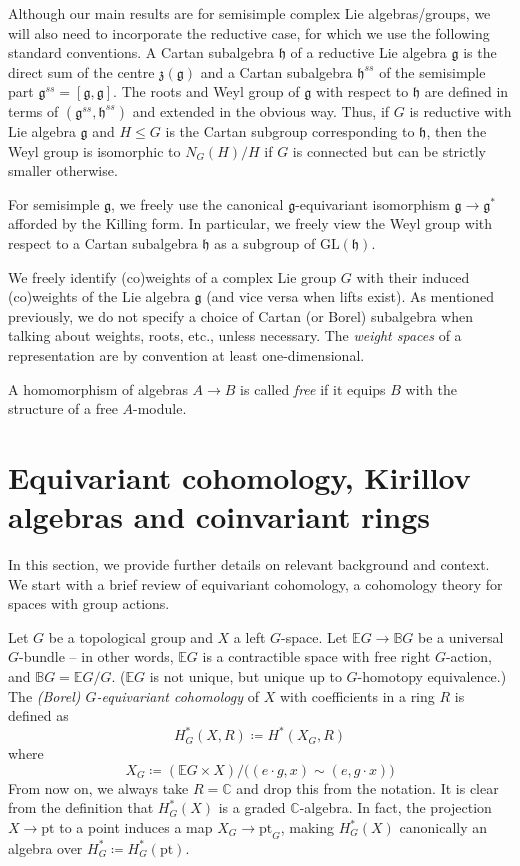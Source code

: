 \documentclass{amsart}
\newcommand{\C}{\mathbb{C}}
\newcommand{\g}{\mathfrak{g}}
\newcommand{\GL}{\mathrm{GL}}
\newcommand{\h}{\mathfrak{h}}
\newcommand{\pt}{\text{pt}}
\newcommand{\z}{\mathfrak{z}}
\theoremstyle{definition}
\theoremstyle{plain}
\theoremstyle{remark}
\begin{document}
Although our main results are for semisimple complex Lie algebras/groups, we will also need to incorporate the reductive case, for which we use the following standard conventions. A Cartan subalgebra $\h$ of a reductive Lie algebra $\g$ is the direct sum of the centre $\z(\g)$ and a Cartan subalgebra $\h^{ss}$ of the semisimple part $\g^{ss}=[\g,\g]$. The roots and Weyl group of $\g$ with respect to $\h$ are defined in terms of $(\g^{ss}, \h^{ss})$ and extended in the obvious way. Thus, if $G$ is reductive with Lie algebra $\g$ and $H\le G$ is the Cartan subgroup corresponding to $\h$, then the Weyl group is isomorphic to $N_G(H)/H$ if $G$ is connected but can be strictly smaller otherwise. 

For semisimple $\g$, we freely use the canonical $\g$-equivariant isomorphism $\g\to \g^*$ afforded by the Killing form. In particular, we freely view the Weyl group with respect to a Cartan subalgebra $\h$ as a subgroup of $\GL(\h)$.

We freely identify (co)weights of a complex Lie group $G$ with their induced (co)weights of the Lie algebra $\g$ (and vice versa when lifts exist). As mentioned previously, we do not specify a choice of Cartan (or Borel) subalgebra when talking about weights, roots, etc., unless necessary. The \emph{weight spaces} of a representation are by convention at least one-dimensional. 

A homomorphism of algebras $A\to B$ is called \emph{free} if it equips $B$ with the structure of a free $A$-module. 

\section{Equivariant cohomology, Kirillov algebras and coinvariant rings}
\label{sec:background}
In this section, we provide further details on relevant background and context. We start with a brief review of equivariant cohomology, a cohomology theory for spaces with group actions.

Let $G$ be a topological group and $X$ a left $G$-space. Let $\mathbb{E}G \to \mathbb{B}G$ be a universal $G$-bundle -- in other words, $\mathbb{E}G$ is a contractible space with free right $G$-action, and $\mathbb{B}G = \mathbb{E}G/G$. ($\mathbb{E}G$ is not unique, but unique up to $G$-homotopy equivalence.) The \emph{(Borel) $G$-equivariant cohomology} of $X$ with coefficients in a ring $R$ is defined as
$$
    H^*_G(X, R)
    \coloneqq
    H^*(X_G, R)
$$
where
$$
    X_G \coloneqq (\mathbb{E}G\times X)/\big( (e\cdot g, x) \sim (e, g\cdot x) \big)
$$
From now on, we always take $R=\C$ and drop this from the notation. It is clear from the definition that $H^*_G(X)$ is a graded $\C$-algebra. In fact, the projection $X\to \pt$ to a point induces a map $X_G\to \pt_G$, making $H^*_G(X)$ canonically an algebra over $H^*_G\coloneqq H^*_G(\pt)$.
\end{document}
